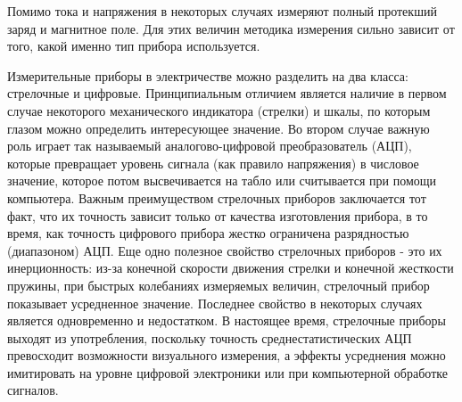 Помимо тока и напряжения в некоторых случаях измеряют полный протекший заряд и магнитное поле. Для этих величин методика измерения сильно зависит от того, какой именно тип прибора используется.

Измерительные приборы в электричестве можно разделить на два класса: стрелочные и цифровые. Принципиальным отличием является наличие в первом случае некоторого механического индикатора (стрелки) и шкалы, по которым глазом можно определить интересующее значение. Во втором случае важную роль играет так называемый аналогово-цифровой преобразователь (АЦП), которые превращает уровень сигнала (как правило напряжения) в числовое значение, которое потом высвечивается на табло или считывается при помощи компьютера. Важным преимуществом стрелочных приборов заключается тот факт, что их точность зависит только от качества изготовления прибора, в то время, как точность цифрового прибора жестко ограничена разрядностью (диапазоном) АЦП. Еще одно полезное свойство стрелочных приборов - это их инерционность: из-за конечной скорости движения стрелки и конечной жесткости пружины, при быстрых колебаниях измеряемых величин, стрелочный прибор показывает усредненное значение. Последнее свойство в некоторых случаях является одновременно и недостатком. В настоящее время, стрелочные приборы выходят из употребления, поскольку точность среднестатистических АЦП превосходит возможности визуального измерения, а эффекты усреднения можно имитировать на уровне цифровой электроники или при компьютерной обработке сигналов.